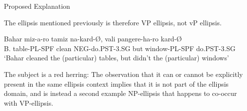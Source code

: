 \documentclass[10pt]{beamer}
\begin{document}
\begin{frame}[fragile]{Proposed Explanation}
  \pause

  \pause
  The ellipsis mentioned previously is therefore VP ellipsis, not vP ellipsis. %

  \pause 
  \begin{exe}
    \ex
    \gll Bahar miz-a-ro tamiz na-kard-Ø, vali pangere-ha-ro kard-Ø\\
    B. table-PL-SPF clean NEG-do.PST-3.SG but window-PL-SPF do.PST-3.SG\\
    \trans `Bahar cleaned the (particular) tables, but didn't the (particular) windows'
  \end{exe}

  \pause
  The subject is a red herring\pause: The observation that it can or cannot be explicitly present in the same ellipsis context implies that it is not part of the ellipsis domain, and is instead a second example NP-ellipsis that happens to co-occur with VP-ellipsis. 


\end{frame}
\end{document}
